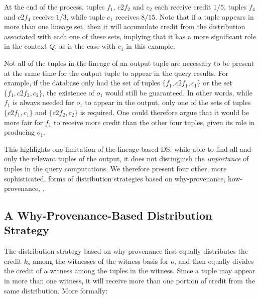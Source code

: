 At the end of the process, tuples $f_1$, $c2f_2$ and $c_2$ each receive credit $1/5$, tuples $f_4$ and $c2f_4$ receive $1/3$, while tuple $c_1$ receives $8/15$.  
Note that if a tuple appears in more than one lineage set, then it will accumulate credit from the distribution associated with each one of these sets, implying that it has a more significant role in the context $Q$, as is the case with $c_1$ in this example.
 
Not all of the tuples in the lineage of an output tuple are necessary to be present at the same time for the output tuple to appear in the query results.  For example, if the database only had the set of  tuples $\{f_1, c2f_1, c_1\}$ or the set $\{f_1, c2f_2, c_2\}$, the existence of $o_1$ would still be guaranteed. 
In other words, while $f_1$ is always needed for $o_1$ to appear in the output, 
only one of the sets of tuples $\{ c2f_1, c_1 \}$ and $\{ c2f_2, c_2 \}$ is required. 
One could therefore argue that it would be more fair for $f_1$ to receive more credit than the other four tuples, given its role in producing $o_1$.  

This highlights one limitation of the lineage-based DS: while able to find all and only the relevant tuples of the output, it does not distinguish the \emph{importance} of tuples in the query computations. 
We therefore present four other, more sophisticated, forms of distribution strategies based on why-provenance, how-provenance, .

\subsection{A Why-Provenance-Based Distribution Strategy}
The distribution strategy based on why-provenance first equally distributes the credit $k_o$ among the witnesses of the witness basis for $o$, and then equally divides the credit of a witness among the tuples in the witness. 
Since a tuple may appear in more than one witness, it will receive more than one portion of credit from the same distribution. More formally:


